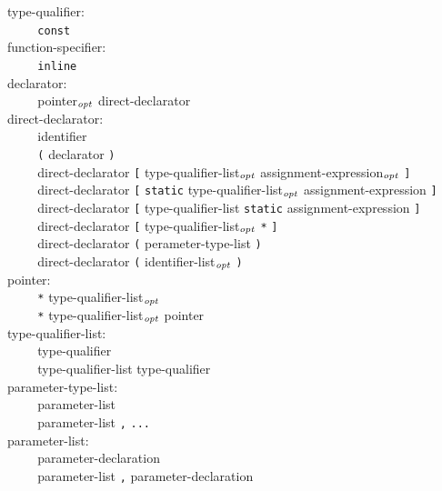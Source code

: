 \documentclass[12pt]{report}
\def\|{\verb|}
\newcommand\opt{$_{{\it opt}}$ }
\begin{document}
\noindent
type-qualifier:\\
\|    | \verb+const+\\

\noindent
function-specifier:\\
\|    | \verb+inline+\\

\noindent
declarator:\\
\|    | pointer\opt direct-declarator\\

\noindent
direct-declarator:\\
\|    | identifier\\
\|    | \verb+(+ declarator \verb+)+\\
\|    | direct-declarator \verb+[+ type-qualifier-list\opt assignment-expression\opt \verb+]+\\
\|    | direct-declarator \verb+[+ \verb+static+ type-qualifier-list\opt assignment-expression \verb+]+\\
\|    | direct-declarator \verb+[+ type-qualifier-list \verb+static+ assignment-expression \verb+]+\\
\|    | direct-declarator \verb+[+ type-qualifier-list\opt \verb+*+ \verb+]+\\
\|    | direct-declarator \verb+(+ perameter-type-list \verb+)+\\
\|    | direct-declarator \verb+(+ identifier-list\opt \verb+)+\\

\noindent
pointer:\\
\|    | \verb+*+ type-qualifier-list\opt\\
\|    | \verb+*+ type-qualifier-list\opt pointer\\

\noindent
type-qualifier-list:\\
\|    | type-qualifier\\
\|    | type-qualifier-list type-qualifier\\

\noindent
parameter-type-list:\\
\|    | parameter-list\\
\|    | parameter-list \verb+,+ \verb+...+\\

\noindent
parameter-list:\\
\|    | parameter-declaration\\
\|    | parameter-list \verb+,+ parameter-declaration\\
\end{document}
